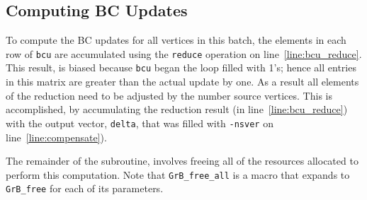 \subsection{Computing BC Updates}

To compute the BC updates for all vertices in this batch, 
the elements in each row of {\tt bcu} are accumulated using the {\tt reduce} 
operation on line~\ref{line:bcu_reduce}.  This result, is biased because 
{\tt bcu} began the loop filled with 1's; hence all entries in this matrix are
greater than the actual update by one.  As a result all elements of the reduction 
need to be adjusted by the number source vertices.  This is accomplished, by
accumulating the reduction result (in line~\ref{line:bcu_reduce}) with the output
vector, {\tt delta}, that was filled with {\tt -nsver} on line~\ref{line:compensate}).

The remainder of the subroutine, involves freeing all of the resources allocated
to perform this computation.  Note that {\tt GrB\_free\_all} is a macro that 
expands to {\tt GrB\_free} for each of its parameters.